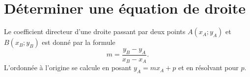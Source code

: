 \section{Déterminer une équation de droite}

%
%
\begin{Aretenir}
    Le coefficient directeur d'une droite passant par deux points \( A(x_A;y_A)\) et \( B(x_B;y_B)\) est donné par la formule
    \begin{equation}
        m=\frac{ y_B-y_A }{ x_B-x_A }.
    \end{equation}
    L'ordonnée à l'origine se calcule en posant \( y_A=mx_A+p\) et en résolvant pour \( p\).
\end{Aretenir}

